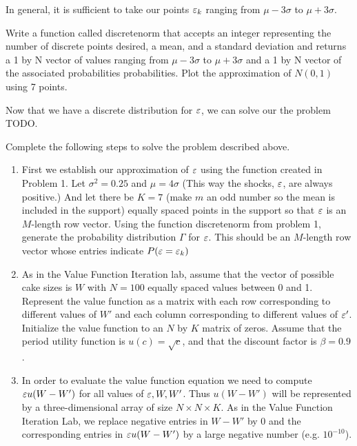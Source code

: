 In general, it is sufficient to take our points $\varepsilon_k$ ranging from $\mu - 3\sigma$ to $\mu + 3\sigma$.

\begin{problem}
Write a function called discretenorm that accepts an integer representing the number of discrete points desired, a mean, and a standard deviation and returns a 1 by N vector of values ranging from $\mu - 3\sigma$ to $\mu + 3\sigma$  and a 1 by N vector of the associated probabilities probabilities.  Plot the approximation of $N(0,1)$ using 7 points. 
\end{problem}

Now that we have a discrete distribution for $\varepsilon$, we can solve our the problem TODO.

\begin{problem}
Complete the following steps to solve the problem described above.
\begin{enumerate}
   \item First we establish our approximation of $\varepsilon$ using the function created in Problem 1. Let $\sigma^2 = 0.25$ and $\mu=4\sigma$ (This way the shocks, $\varepsilon$, are always positive.) And let there be $K=7$ (make $m$ an odd number so the mean is included in the support) equally spaced points in the support so that $\varepsilon$ is an $M$-length row vector.  Using the function discretenorm from problem 1, generate the probability distribution $\Gamma$ for $\varepsilon$. This should be an $M$-length row vector whose entries indicate $P(\varepsilon = \varepsilon_k)$

   \item As in the Value Function Iteration lab, assume that the vector of possible cake sizes is $W$ with $N=100$ equally spaced values between 0 and 1.  Represent the value function as a matrix with each row corresponding to different values of $W'$ and each column corresponding to different values of $\varepsilon'$. Initialize the value function to an $N$ by $K$ matrix of zeros.  Assume that the period utility function is $u(c)=\sqrt{c}$, and that the discount factor is $\beta = 0.9$.
       

   \item In order to evaluate the value function equation we need to compute $\varepsilon u(W-W')$ for all values of $\varepsilon,W,W'$.  Thus $u(W-W')$ will be represented by a three-dimensional array of size $N\times N\times K$.  As in the Value Function Iteration Lab, we replace negative entries in $W-W'$ by 0 and the corresponding entries in $\varepsilon u(W-W')$ by a large negative number (e.g. $10^{-10}$).
       

\end{enumerate}
\end{problem}
